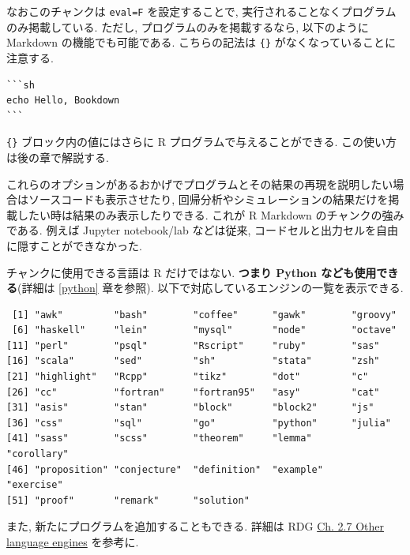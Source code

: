 \documentclass[
]{bxjsbook}
\newenvironment{Shaded}{\begin{snugshade}}{\end{snugshade}}
\newcommand{\FunctionTok}[1]{\textcolor[rgb]{0.00,0.00,0.00}{#1}}
\newcommand{\NormalTok}[1]{#1}
\newcommand{\SpecialCharTok}[1]{\textcolor[rgb]{0.00,0.00,0.00}{#1}}
\theoremstyle{definition}
\theoremstyle{definition}
\theoremstyle{definition}
\theoremstyle{remark}
\begin{document}
なおこのチャンクは \texttt{eval=F} を設定することで,
実行されることなくプログラムのみ掲載している. ただし,
プログラムのみを掲載するなら, 以下のように Markdown
の機能でも可能である. こちらの記法は \texttt{\{\}}
がなくなっていることに注意する.

\begin{verbatim}
```sh
echo Hello, Bookdown
```
\end{verbatim}

\texttt{\{\}} ブロック内の値にはさらに R プログラムで与えることができる.
この使い方は後の章で解説する.

これらのオプションがあるおかげでプログラムとその結果の再現を説明したい場合はソースコードも表示させたり,
回帰分析やシミュレーションの結果だけを掲載したい時は結果のみ表示したりできる.
これが R Markdown のチャンクの強みである. 例えば Jupyter notebook/lab
などは従来, コードセルと出力セルを自由に隠すことができなかった.

チャンクに使用できる言語は R だけではない. \textbf{つまり Python
なども使用できる}(詳細は \ref{python} 章を参照).
以下で対応しているエンジンの一覧を表示できる.

\begin{Shaded}
\end{Shaded}

\begin{verbatim}
 [1] "awk"         "bash"        "coffee"      "gawk"        "groovy"     
 [6] "haskell"     "lein"        "mysql"       "node"        "octave"     
[11] "perl"        "psql"        "Rscript"     "ruby"        "sas"        
[16] "scala"       "sed"         "sh"          "stata"       "zsh"        
[21] "highlight"   "Rcpp"        "tikz"        "dot"         "c"          
[26] "cc"          "fortran"     "fortran95"   "asy"         "cat"        
[31] "asis"        "stan"        "block"       "block2"      "js"         
[36] "css"         "sql"         "go"          "python"      "julia"      
[41] "sass"        "scss"        "theorem"     "lemma"       "corollary"  
[46] "proposition" "conjecture"  "definition"  "example"     "exercise"   
[51] "proof"       "remark"      "solution"   
\end{verbatim}

また, 新たにプログラムを追加することもできる. 詳細は RDG
\href{https://bookdown.org/yihui/rmarkdown/language-engines.html}{Ch.
2.7 Other language engines} を参考に.
\end{document}
